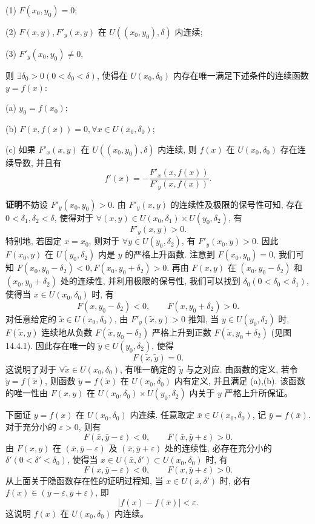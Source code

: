 \documentclass[UTF8, 12pt, fontset=fandol, oneside]{ctexart}
\begin{document}
(1) $F(x_0,y_0)=0$;

(2) $F(x,y),F'_y(x,y)$ 在 $U((x_0,y_0),\delta)$ 内连续;

(3) $F'_y(x_0,y_0)\ne0$,

则 $\exists\delta_0>0(0<\delta_0<\delta)$, 使得在 $U(x_0,\delta_0)$ 内存在唯一满足下述条件的连续函数 $y=f(x)$:

(a) $y_0=f(x_0)$;

(b) $F(x,f(x))=0,\forall x\in U(x_0,\delta_0)$;

(c) 如果 $F'_x(x,y)$ 在 $U((x_0,y_0),\delta)$ 内连续, 则 $f(x)$ 在 $U(x_0,\delta_0)$ 存在连续导数, 并且有
\[
  f'(x)=-\frac{F'_x(x,f(x))}{F'_y(x,f(x))}.
\]

\noindent\textbf{证明}\quad 不妨设 $F'_y(x_0,y_0)>0$. 由 $F'_y(x,y)$ 的连续性及极限的保号性可知, 存在 $0<\delta_1,\delta_2<\delta$, 使得对于 $\forall(x,y)\in U(x_0,\delta_1)\times U(y_0,\delta_2)$, 有
\[
  F'_y(x,y)>0.
\]
特别地, 若固定 $x=x_0$, 则对于 $\forall y\in U(y_0,\delta_2)$, 有 $F'_y(x_0,y)>0$. 因此 $F(x_0,y)$ 在 $U(y_0,\delta_2)$ 内是 $y$ 的严格上升函数. 注意到 $F(x_0,y_0)=0$, 我们可知 $F(x_0,y_0-\delta_2)<0,F(x_0,y_0+\delta_2)>0$. 再由 $F(x,y)$ 在 $(x_0,y_0-\delta_2)$ 和 $(x_0,y_0+\delta_2)$ 处的连续性, 并利用极限的保号性, 我们可以找到 $\delta_0(0<\delta_0<\delta_1)$, 使得当 $x\in U(x_0,\delta_0)$ 时, 有
\[
  F(x,y_0-\delta_2)<0,\qquad F(x,y_0+\delta_2)>0.
\]
对任意给定的 $\tilde x\in U(x_0,\delta_0)$, 由 $F'_y(\tilde x,y)>0$ 推知, 当 $y\in U(y_0,\delta_2)$ 时, $F(\tilde x,y)$ 连续地从负数 $F(\tilde x,y_0-\delta_2)$ 严格上升到正数 $F(\tilde x,y_0+\delta_2)$ (见图 14.4.1). 因此存在唯一的 $\tilde y\in U(y_0,\delta_2)$, 使得
\[
  F(\tilde x,\tilde y)=0.
\]
这说明了对于 $\forall\tilde x\in U(x_0,\delta_0)$, 有唯一确定的 $\tilde y$ 与之对应. 由函数的定义, 若令 $\tilde y=f(\tilde x)$, 则函数 $\tilde y=f(\tilde x)$ 在 $U(x_0,\delta_0)$ 内有定义, 并且满足 (a),(b). 该函数的唯一性由 $F(x,y)$ 在 $U(x_0,\delta_0)\times U(y_0,\delta_2)$ 内关于 $y$ 严格上升所保证。

下面证 $y=f(x)$ 在 $U(x_0,\delta_0)$ 内连续. 任意取定 $\bar x\in U(x_0,\delta_0)$, 记 $\bar y=f(\bar x)$. 对于充分小的 $\varepsilon>0$, 则有
\[
  F(\bar x,\bar y-\varepsilon)<0,\qquad F(\bar x,\bar y+\varepsilon)>0.
\]
由 $F(x,y)$ 在 $(\bar x,\bar y-\varepsilon)$ 及 $(\bar x,\bar y+\varepsilon)$ 处的连续性, 必存在充分小的 $\delta'(0<\delta'<\delta_0)$, 使得当 $x\in U(\bar x,\delta')\subset U(x_0,\delta_0)$ 时, 有
\[
  F(x,\bar y-\varepsilon)<0,\qquad F(x,\bar y+\varepsilon)>0.
\]
从上面关于隐函数存在性的证明过程知, 当 $x\in U(\bar x,\delta')$ 时, 必有 $f(x)\in(\bar y-\varepsilon,\bar y+\varepsilon)$, 即
\[
  |f(x)-f(\bar x)|<\varepsilon.
\]
这说明 $f(x)$ 在 $U(x_0,\delta_0)$ 内连续。
\end{document}
